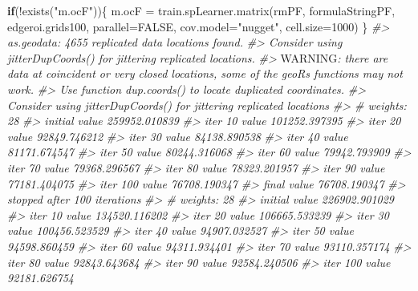 \documentclass[
  graybox,natbib,nospthms]{svmono}
\newenvironment{Shaded}{\begin{snugshade}}{\end{snugshade}}
\newcommand{\AlertTok}[1]{\textcolor[rgb]{0.33,0.33,0.33}{#1}}
\newcommand{\AttributeTok}[1]{\textcolor[rgb]{0.61,0.61,0.61}{#1}}
\newcommand{\CommentTok}[1]{\textcolor[rgb]{0.37,0.37,0.37}{\textit{#1}}}
\newcommand{\ConstantTok}[1]{\textcolor[rgb]{0,0,0}{#1}}
\newcommand{\ControlFlowTok}[1]{\textcolor[rgb]{0.27,0.27,0.27}{\textbf{#1}}}
\newcommand{\DecValTok}[1]{\textcolor[rgb]{0.06,0.06,0.06}{#1}}
\newcommand{\FunctionTok}[1]{\textcolor[rgb]{0,0,0}{#1}}
\newcommand{\NormalTok}[1]{#1}
\newcommand{\OtherTok}[1]{\textcolor[rgb]{0.37,0.37,0.37}{#1}}
\newcommand{\SpecialCharTok}[1]{\textcolor[rgb]{0,0,0}{#1}}
\newcommand{\StringTok}[1]{\textcolor[rgb]{0.5,0.5,0.5}{#1}}
\begin{document}
\begin{Shaded}
\begin{Highlighting}[]
\ControlFlowTok{if}\NormalTok{(}\SpecialCharTok{!}\FunctionTok{exists}\NormalTok{(}\StringTok{"m.ocF"}\NormalTok{))\{}
\NormalTok{  m.ocF }\OtherTok{=} \FunctionTok{train.spLearner.matrix}\NormalTok{(rmPF, formulaStringPF, edgeroi.grids100, }
                        \AttributeTok{parallel=}\ConstantTok{FALSE}\NormalTok{, }\AttributeTok{cov.model=}\StringTok{"nugget"}\NormalTok{, }\AttributeTok{cell.size=}\DecValTok{1000}\NormalTok{)}
\NormalTok{\}}
\CommentTok{\#\textgreater{} as.geodata: 4655 replicated data locations found. }
\CommentTok{\#\textgreater{}  Consider using jitterDupCoords() for jittering replicated locations. }
\CommentTok{\#\textgreater{} }\AlertTok{WARNING}\CommentTok{: there are data at coincident or very closed locations, some of the geoR\textquotesingle{}s functions may not work.}
\CommentTok{\#\textgreater{}  Use function dup.coords() to locate duplicated coordinates.}
\CommentTok{\#\textgreater{}  Consider using jitterDupCoords() for jittering replicated locations }
\CommentTok{\#\textgreater{} \# weights:  28}
\CommentTok{\#\textgreater{} initial  value 259952.010839 }
\CommentTok{\#\textgreater{} iter  10 value 101252.397395}
\CommentTok{\#\textgreater{} iter  20 value 92849.746212}
\CommentTok{\#\textgreater{} iter  30 value 84138.890538}
\CommentTok{\#\textgreater{} iter  40 value 81171.674547}
\CommentTok{\#\textgreater{} iter  50 value 80244.316068}
\CommentTok{\#\textgreater{} iter  60 value 79942.793909}
\CommentTok{\#\textgreater{} iter  70 value 79368.296567}
\CommentTok{\#\textgreater{} iter  80 value 78323.201957}
\CommentTok{\#\textgreater{} iter  90 value 77181.404075}
\CommentTok{\#\textgreater{} iter 100 value 76708.190347}
\CommentTok{\#\textgreater{} final  value 76708.190347 }
\CommentTok{\#\textgreater{} stopped after 100 iterations}
\CommentTok{\#\textgreater{} \# weights:  28}
\CommentTok{\#\textgreater{} initial  value 226902.901029 }
\CommentTok{\#\textgreater{} iter  10 value 134520.116202}
\CommentTok{\#\textgreater{} iter  20 value 106665.533239}
\CommentTok{\#\textgreater{} iter  30 value 100456.523529}
\CommentTok{\#\textgreater{} iter  40 value 94907.032527}
\CommentTok{\#\textgreater{} iter  50 value 94598.860459}
\CommentTok{\#\textgreater{} iter  60 value 94311.934401}
\CommentTok{\#\textgreater{} iter  70 value 93110.357174}
\CommentTok{\#\textgreater{} iter  80 value 92843.643684}
\CommentTok{\#\textgreater{} iter  90 value 92584.240506}
\CommentTok{\#\textgreater{} iter 100 value 92181.626754}

\end{Highlighting}
\end{Shaded}
\end{document}
